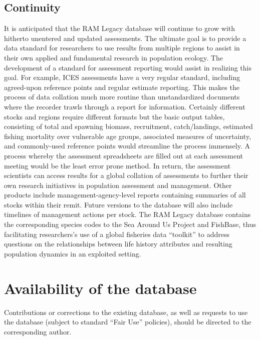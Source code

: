 \documentclass[letterpaper,12pt]{article}
\begin{document}
\subsection{Continuity}
It is anticipated that the RAM Legacy database will continue to grow
with hitherto unentered and updated assessments. The ultimate goal is
to provide a data standard for researchers to use results from
multiple regions to assist in their own applied and fundamental
research in population ecology. The development of a standard for
assessment reporting would assist in realizing this goal. For example,
ICES assessments have a very regular standard, including agreed-upon
reference points and regular estimate reporting. This makes the
process of data collation much more routine than unstandardized
documents where the recorder trawls through a report for information.
Certainly different stocks and regions require different formats but
the basic output tables, consisting of total and spawning biomass,
recruitment, catch/landings, estimated fishing mortality over
vulnerable age groups, associated measures of uncertainty, and
commonly-used reference points would streamline the process immensely.
A process whereby the assessment spreadsheets are filled out at each
assessment meeting would be the least error prone method. In return,
the assessment scientists can access results for a global collation of
assessments to further their own research initiatives in population
assessment and management. Other products include
management-agency-level reports containing summaries of all stocks
within their remit. Future versions to the database will also include
timelines of management actions per stock. The RAM Legacy database
contains the corresponding species codes to the Sea Around Us Project
and FishBase, thus facilitating researchers's use of a global
fisheries data ``toolkit'' to address questions on the relationships
between life history attributes and resulting population
dynamics in an exploited setting.


\begin{comment}
- Weather forecasting and climatology note don't
use these terms (central repository)
\end{comment}

\newpage

\section*{Availability of the database} 
Contributions or corrections to the existing database, as well as
requests to use the database (subject to standard ``Fair Use''
policies), should be directed to the corresponding author. 
\end{document}
